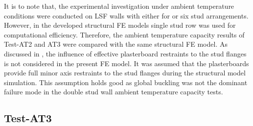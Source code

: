 It is to note that, the experimental investigation under ambient temperature conditions were conducted on LSF walls with either for or six stud arrangements. However, in the developed structural FE models single stud row was used for computational efficiency. Therefore, the ambient temperature capacity results of Test-AT2 and AT3 were compared with the same structural FE model. As discussed in ,  the influence of effective plasterboard restraints to the stud flanges is not considered in the present FE model. It was assumed that the plasterboards provide full minor axis restraints to the stud flanges during the structural model simulation. This assumption holds good as global buckling was not the dominant failure mode in the double stud wall ambient temperature capacity tests.

\subsection*{Test-AT3}

